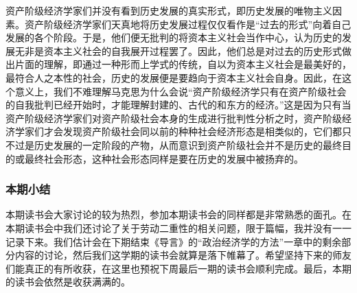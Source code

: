 \documentclass[a4paper,twoside,12pt,AutoFakeBold]{ctexart}
\begin{document}
资产阶级经济学家们并没有看到历史发展的真实形式，即历史发展的唯物主义因素。资产阶级经济学家们天真地将历史发展过程仅仅看作是“过去的形式”向着自己发展的各个阶段。于是，他们便无批判的将资本主义社会当作中心，认为历史的发展无非是资本主义社会的自我展开过程罢了。因此，他们总是对过去的历史形式做出片面的理解，即通过一种形而上学式的传统，自以为资本主义社会是最美好的，最符合人之本性的社会，历史的发展便是要趋向于资本主义社会自身。因此，在这个意义上，我们不难理解马克思为什么会说“资产阶级经济学只有在资产阶级社会的自我批判已经开始时，才能理解封建的、古代的和东方的经济。”这是因为只有当资产阶级经济学家们对资产阶级社会本身的生成进行批判性分析之时，资产阶级经济学家们才会发现资产阶级社会同以前的种种社会经济形态是相类似的，它们都只不过是历史发展的一定阶段的产物，从而意识到资产阶级社会并不是历史的最终目的或最终社会形态，这种社会形态同样是要在历史的发展中被扬弃的。
\subsubsection{本期小结}

本期读书会大家讨论的较为热烈，参加本期读书会的同样都是非常熟悉的面孔。在本期读书会中我们还讨论了关于劳动二重性的相关问题，限于篇幅，我并没有一一记录下来。我们估计会在下期结束《导言》的“政治经济学的方法”一章中的剩余部分内容的讨论，然后我们这学期的读书会就算是落下帷幕了。希望坚持下来的师友们能真正的有所收获，在这里也预祝下周最后一期的读书会顺利完成。最后，本期的读书会依然是收获满满的。
\end{document}
